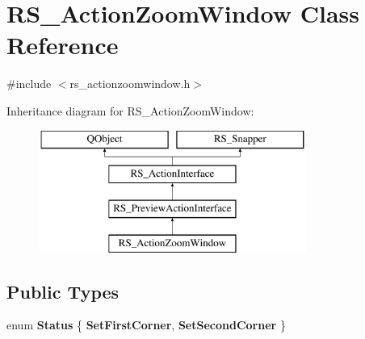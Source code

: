 \hypertarget{classRS__ActionZoomWindow}{\section{R\-S\-\_\-\-Action\-Zoom\-Window Class Reference}
\label{classRS__ActionZoomWindow}
}


{\ttfamily \#include $<$rs\-\_\-actionzoomwindow.\-h$>$}

Inheritance diagram for R\-S\-\_\-\-Action\-Zoom\-Window\-:\begin{figure}[H]
\begin{center}
\leavevmode
\includegraphics[height=4.000000cm]{classRS__ActionZoomWindow}
\end{center}
\end{figure}
\subsection*{Public Types}
\begin{DoxyCompactItemize}
\item 
enum {\bfseries Status} \{ {\bfseries Set\-First\-Corner}, 
{\bfseries Set\-Second\-Corner}
 \}
\end{DoxyCompactItemize}
